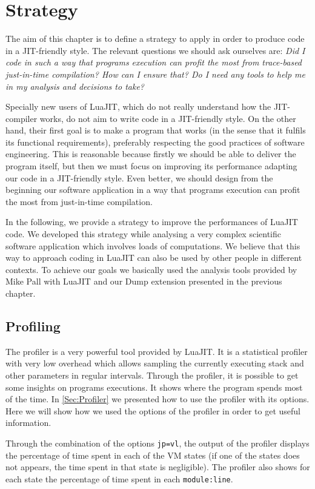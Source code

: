 \chapter{Strategy}

The aim of this chapter is to define a strategy to apply in order to produce code in a JIT-friendly style. The relevant questions we should ask ourselves are: \textit{Did I code in such a way that programs execution can profit the most from trace-based just-in-time compilation? How can I ensure that? Do I need any tools to help me in my analysis and decisions to take?}

Specially new users of LuaJIT, which do not really understand how the JIT-compiler works, do not aim to write code in a JIT-friendly style. On the other hand, their first goal is to make a program that works (in the sense that it fulfils its functional requirements), preferably respecting the good practices of software engineering. This is reasonable because firstly we should be able to deliver the program itself, but then we must focus on improving its performance adapting our code in a JIT-friendly style. Even better, we should design from the beginning our software application in a way that programs execution can profit the most from just-in-time compilation.

In the following, we provide a strategy to improve the performances of LuaJIT code.  We developed this strategy while analysing a very complex scientific software application which involves loads of computations. We believe that this way to approach coding in LuaJIT can also be used by other people in different contexts. To achieve our goals we basically used the analysis tools provided by Mike Pall with LuaJIT and our Dump extension presented in the previous chapter.

\section{Profiling}
The profiler is a very powerful tool provided by LuaJIT. It is a statistical profiler with very low overhead which allows sampling the currently executing stack and other parameters in regular intervals. Through the profiler, it is possible to get some insights on programs executions. It shows where the program spends most of the time. In \ref{Sec:Profiler} we presented how to use the profiler with its options. Here we will show how we used the options of the profiler in order to get useful information.

Through the combination of the options \texttt{jp=vl}, the output of the profiler displays the percentage of time spent in each of the VM states (if one of the states does not appears, the time spent in that state is negligible). The profiler also shows for each state the percentage of time spent in each \texttt{module:line}.

